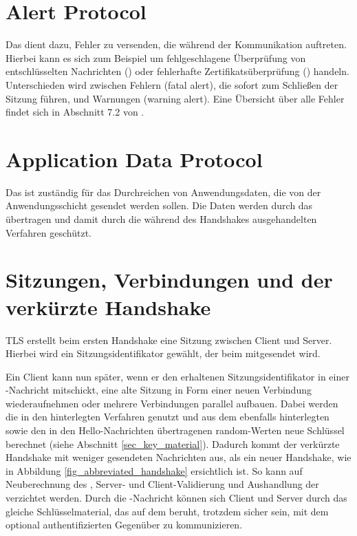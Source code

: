 \section{Alert Protocol}

Das \alertprotocol{} dient dazu, Fehler zu versenden, die während der Kommunikation auftreten. Hierbei kann es sich zum Beispiel um fehlgeschlagene Überprüfung von entschlüsselten Nachrichten (\badrecordmac{}) oder fehlerhafte Zertifikatsüberprüfung (\badcertificate{}) handeln. Unterschieden wird zwischen Fehlern (fatal alert), die sofort zum Schließen der Sitzung führen, und Warnungen (warning alert). Eine Übersicht über alle Fehler findet sich in Abschnitt 7.2 von \cite{tls12}.

\section{Application Data Protocol}

Das \applicationdataprotocol{} ist zuständig für das Durchreichen von Anwendungsdaten, die von der Anwendungsschicht gesendet werden sollen. Die Daten werden durch das \recordprotocol{} übertragen und damit durch die während des Handshakes ausgehandelten Verfahren geschützt.

\section{Sitzungen, Verbindungen und der verkürzte Handshake}
\label{sec_session_connection}


TLS erstellt beim ersten Handshake eine Sitzung zwischen Client und Server. Hierbei wird ein Sitzungsidentifikator gewählt, der beim \serverhello{} mitgesendet wird. 

Ein Client kann nun später, wenn er den erhaltenen Sitzungsidentifikator in einer \clienthello{}-Nachricht mitschickt, eine alte Sitzung in Form einer neuen Verbindung wiederaufnehmen oder mehrere Verbindungen parallel aufbauen. Dabei werden die in den  hinterlegten Verfahren genutzt und aus dem ebenfalls hinterlegten \mastersecret{} sowie den in den Hello-Nachrichten übertragenen random-Werten neue Schlüssel berechnet (siehe Abschnitt \ref{sec_key_material}). Dadurch kommt der verkürzte Handshake mit weniger gesendeten Nachrichten aus, als ein neuer Handshake, wie in Abbildung \ref{fig_abbreviated_handshake} ersichtlich ist. So kann auf Neuberechnung des \mastersecret{}, Server- und Client-Validierung und Aushandlung der \ciphersuite{} verzichtet werden. Durch die \finished{}-Nachricht können sich Client und Server durch das gleiche Schlüsselmaterial, das auf dem \mastersecret{} beruht, trotzdem sicher sein, mit dem optional authentifizierten Gegenüber zu kommunizieren.

